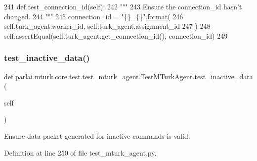 \begin{DoxyCode}
241     \textcolor{keyword}{def }test\_connection\_id(self):
242         \textcolor{stringliteral}{"""}
243 \textcolor{stringliteral}{        Ensure the connection\_id hasn't changed.}
244 \textcolor{stringliteral}{        """}
245         connection\_id = \textcolor{stringliteral}{"\{\}\_\{\}"}.\hyperlink{namespaceparlai_1_1chat__service_1_1services_1_1messenger_1_1shared__utils_a32e2e2022b824fbaf80c747160b52a76}{format}(
246             self.turk\_agent.worker\_id, self.turk\_agent.assignment\_id
247         )
248         self.assertEqual(self.turk\_agent.get\_connection\_id(), connection\_id)
249 
\end{DoxyCode}
\mbox{\label{classparlai_1_1mturk_1_1core_1_1test_1_1test__mturk__agent_1_1TestMTurkAgent_a4b06a974f692520ee9ddbb9f40a5c5bf}} 
\subsubsection{\texorpdfstring{test\+\_\+inactive\+\_\+data()}{test\_inactive\_data()}}
{\footnotesize\ttfamily def parlai.\+mturk.\+core.\+test.\+test\+\_\+mturk\+\_\+agent.\+Test\+M\+Turk\+Agent.\+test\+\_\+inactive\+\_\+data (\begin{DoxyParamCaption}\item[{}]{self }\end{DoxyParamCaption})}

\begin{DoxyVerb}Ensure data packet generated for inactive commands is valid.
\end{DoxyVerb}
 

Definition at line 250 of file test\+\_\+mturk\+\_\+agent.\+py.


